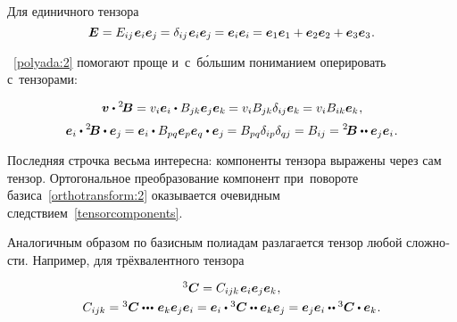 \begin{otherlanguage}{russian}
\vspace{-0.2em} Для единичного тензора
\[ \bm{E} =
E_{ij} \hspace{.16ex} \bm{e}_i \bm{e}_j \hspace{-0.1ex} =
\delta_{ij} \hspace{.16ex} \bm{e}_i \bm{e}_j \hspace{-0.1ex} =
\bm{e}_i \bm{e}_i \hspace{-0.1ex} =
\bm{e}_1 \bm{e}_1 + \bm{e}_2 \bm{e}_2 + \bm{e}_3 \bm{e}_3
\hspace{.1ex} . \]

~\eqref{polyada:2} помогают проще и~с~б\'{о}льшим пониманием оперировать с~тензорами:

\nopagebreak\vspace{-0.1em}\begin{equation*}
\bm{v} \dotp {^2\!\bm{B}} =
v_i\bm{e}_i \dotp B_{jk}\bm{e}_j\bm{e}_k \hspace{-0.1ex} =
v_i B_{jk} \delta_{ij} \bm{e}_k \hspace{-0.1ex} =
v_i B_{ik} \bm{e}_k \hspace{.1ex} ,
\end{equation*}\vspace{-1.25em}
\begin{equation}\label{tensorcomponents}
\bm{e}_i \dotp {^2\!\bm{B}} \dotp \bm{e}_j \hspace{-0.1ex} =
\bm{e}_i \dotp B_{pq}\bm{e}_p\bm{e}_q \dotp \bm{e}_j \hspace{-0.1ex} =
B_{pq} \delta_{ip} \delta_{qj} =
B_{ij} =
{^2\!\bm{B}} \dotdotp \bm{e}_j \bm{e}_i \hspace{.1ex} .
\end{equation}

Последняя строчка весьма интересна: компоненты тензора выражены через сам тензор. Ортогональное преобразование компонент при~повороте базиса~\eqref{orthotransform:2} оказывается очевидным следствием~\eqref{tensorcomponents}.

Аналогичным образом по базисным полиадам разлагается тензор любой сложности. Например, для трёхвалентного тензора

\nopagebreak\begin{equation}\label{polyada:3}
\begin{array}{c}
{^3\!\,\bm{C}} = C_{ijk} \hspace{0.2ex} \bm{e}_i \bm{e}_j \bm{e}_k \hspace{0.1ex},\\[0.8ex]
C_{ijk} = {^3\!\,\bm{C}} \dotdotdotp \bm{e}_k \bm{e}_j \bm{e}_i = \bm{e}_i \dotp {^3\!\,\bm{C}} \dotdotp \bm{e}_k \bm{e}_j = \bm{e}_j \bm{e}_i \dotdotp {^3\!\,\bm{C}} \dotp \bm{e}_k \hspace{0.1ex}.
\end{array}
\end{equation}


\end{otherlanguage}

